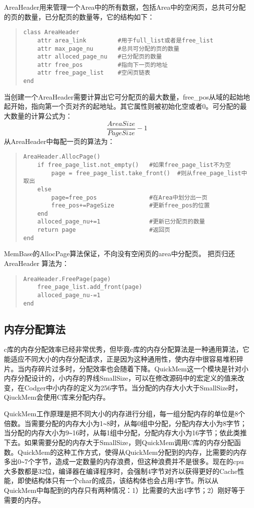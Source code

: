 AreaHeader用来管理一个Area中的所有数据，包括Area中的空闲页，总共可分配的页的数量，已分配页的数量等，它的结构如下：
\begin{quote}
\begin{verbatim}
class AreaHeader 
    attr area_link         #用于full_list或者是free_list
    attr max_page_nu       #总共可分配的页的数量
    attr alloced_page_nu   #已分配页的数量
    attr free_pos          #指向下一页的地址
    attr free_page_list    #空闲页链表
end 
\end{verbatim}
\end{quote}
当创建一个AreaHeader需要计算出它可分配页的最大数量，free\_pos从域的起始地起开始，指向第一个页对齐的起地址。其它属性则被初始化空或者0。可分配的最大数量的计算公式为：
\[\frac{AreaSize}{PageSize}-1\]
从AreaHeader中每配一页的算法为：
\begin{quote}
\begin{verbatim}
AreaHeader.AllocPage()
    if free_page_list.not_empty()   #如果free_page_list不为空
        page = free_page_list.take_front()  #则从free_page_list中取出
    else
        page=free_pos               #在Area中划分出一页
        free_pos+=PageSize          #更新free_pos的位置
    end 
    alloced_page_nu+=1              #更新已分配页的数量
    return page                     #返回页
end 
\end{verbatim}
\end{quote}
MemBase的AllocPage算法保证，不向没有空闲页的area中分配页。 把页归还 AreaHeader 算法为：
\begin{quote}
\begin{verbatim}
AreaHeader.FreePage(page)
    free_page_list.add_front(page)
    alloced_page_nu-=1
end 
\end{verbatim}
\end{quote}

\subsection{内存分配算法}
c库的内存分配效率已经非常优秀，但毕竟c库的内存分配算法是一种通用算法，它能适应不同大小的内存分配请求，正是因为这种通用性，使内存中很容易堆积碎片。当内存碎片过多时，分配效率也会随着下降。QuickMem这一个模块是针对小内存分配设计的，小内存的界线SmallSize，可以在修改源码中的宏定义的值来改变，在Codger中小内存的定义为256字节。当分配的内存大小大于SmallSize时，QiuckMem会使用C库来分配内存。

QuickMem工作原理是把不同大小的内存进行分组，每一组分配内存的单位是8个倍数。当需要分配的内存大小为1\verb|~|8时，从每0组中分配，分配内存大小为8字节；当分配的内存大小为9\verb|~|16时，从每1组中分配，分配内存大小为16字节；依此类推下去。如果需要分配的内存大于SmallSize，则QuickMem调用C库的内存分配函数。QuickMem的这种工作方式，使得从QuickMem分配到的内存，比需要的内存多出0\verb|~|7个字节，造成一定数量的内存浪费，但这种浪费并不是很多。现在的cpu大多数都是32位，编译器在编译程序时，会强制4字节对齐以获得更好的Cache性能，即使结构体只有一个char的成员，该结构体也会占用4字节。所以从QuickMem中每配到的内存只有两种情况：1）比需要的大出4字节；2）刚好等于需要的内存。

